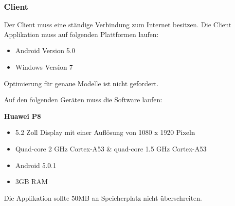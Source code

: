 \documentclass[a4paper,12pt,oneside]{scrartcl}
\begin{document}
\subsubsection*{Client}
Der Client muss eine ständige Verbindung zum Internet besitzen.
Die Client Applikation muss auf folgenden Plattformen laufen: 
\begin{itemize}
	\item Android Version 5.0
	\item Windows Version 7
\end{itemize} 
Optimierung für genaue Modelle ist nicht gefordert.

Auf den folgenden Geräten muss die Software laufen:

\textbf{Huawei P8}
\begin{itemize}
	\item 5.2 Zoll Display mit einer Auflösung von 1080 x 1920 Pixeln
	\item Quad-core 2 GHz Cortex-A53 \& quad-core 1.5 GHz Cortex-A53
	\item Android 5.0.1
	\item 3GB RAM
\end{itemize} 



Die Applikation sollte 50MB an Speicherplatz nicht überschreiten.
\end{document}
